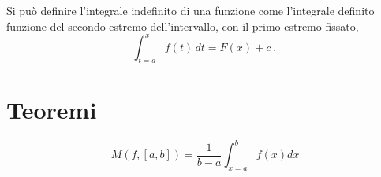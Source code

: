 \begin{definition} Si può definire l'integrale indefinito di una funzione come l'integrale definito funzione del secondo estremo dell'intervallo, con il primo estremo fissato, 
    \begin{equation}
        \int_{t=a}^{x} f(t) \, dt = F(x) + c \ ,
    \end{equation}
\end{definition}

\section{Teoremi}
\begin{definition}[Media]
    \begin{equation}
        M(f, [a,b]) = \dfrac{1}{b-a} \int_{x=a}^{b} f(x) dx
    \end{equation}
\end{definition}

